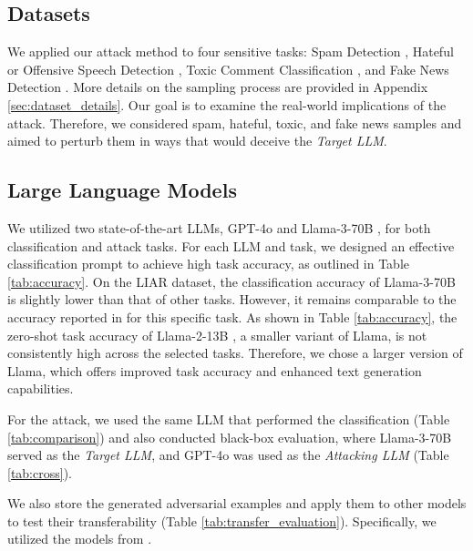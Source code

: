 \documentclass[11pt]{article}
\begin{document}
\subsection{Datasets}
We applied our attack method to four sensitive tasks: Spam Detection \cite{10.1145/2034691.2034742, deysi_spam_2023}, Hateful or Offensive Speech Detection \cite{hateoffensive}, Toxic Comment Classification \cite{jigsaw-toxic-comment-classification-challenge}, and Fake News Detection \cite{wang-2017-liar}. More details on the sampling process are provided in Appendix \ref{sec:dataset_details}.
Our goal is to examine the real-world implications of the attack. Therefore, we considered spam, hateful, toxic, and fake news samples and aimed to perturb them in ways that would deceive the \textsl{Target LLM}. 




\subsection{Large Language Models}
We utilized two state-of-the-art LLMs, GPT-4o \cite{openai2024gpt4o} and Llama-3-70B \cite{grattafiori2024llama3herdmodels}, for both classification and attack tasks.  For each LLM and task, we designed an effective classification prompt to achieve high task accuracy, as outlined in Table \ref{tab:accuracy}. On the LIAR dataset, the classification accuracy of Llama-3-70B is slightly lower than that of other tasks. However, it remains comparable to the accuracy reported in \cite{wang-2017-liar, alhindi-etal-2018-evidence, 9786925} for this specific task. As shown in Table \ref{tab:accuracy}, the zero-shot task accuracy of Llama-2-13B \cite{touvron2023llama2openfoundation},  a smaller variant of Llama, is not consistently high across the selected tasks. Therefore, we chose a larger version of Llama, which offers improved task accuracy and enhanced text generation capabilities.

For the attack, we used the same LLM that performed the classification (Table \ref{tab:comparison}) and also conducted black-box evaluation, where Llama-3-70B served as the \textsl{Target LLM}, and GPT-4o was used as the \textsl{Attacking LLM} (Table \ref{tab:cross}).

We also store the generated adversarial examples and apply them to other models to test their transferability (Table \ref{tab:transfer_evaluation}). Specifically, we utilized the models from \cite{mathew2020hatexplain, bert_toxic_comment_classification, sileo-2024-tasksource}.
\end{document}
